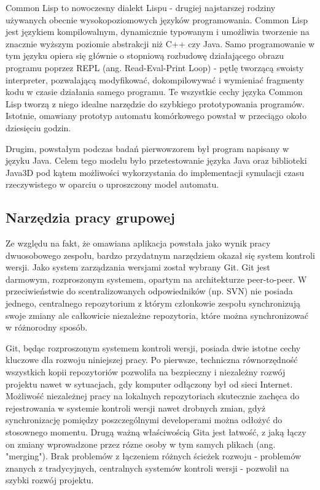 Common Lisp to nowoczesny dialekt Lispu - drugiej najstarszej rodziny używanych obecnie wysokopoziomowych języków programowania. Common Lisp jest językiem kompilowalnym, dynamicznie typowanym i umożliwia tworzenie na znacznie wyższym poziomie abstrakcji niż C++ czy Java. Samo programowanie w tym języku opiera się głównie o stopniową rozbudowę działającego obrazu programu poprzez REPL (ang. Read-Eval-Print Loop) - pętlę tworzącą swoisty interpreter, pozwalającą modyfikować, dokompilowywać i wymieniać fragmenty kodu w czasie działania samego programu. Te wszystkie cechy języka Common Lisp tworzą z niego idealne narzędzie do szybkiego prototypowania programów. Istotnie, omawiany prototyp automatu komórkowego powstał w przeciągo około dziesięciu godzin.

Drugim, powstałym podczas badań pierwowzorem był program napisany w języku Java.
Celem tego modelu było przetestowanie języka Java oraz biblioteki Java3D pod kątem możliwości wykorzystania do implementacji symulacji czasu rzeczywistego w oparciu o uproszczony model automatu. 

\subsection {Narzędzia pracy grupowej}
Ze względu na fakt, że omawiana aplikacja powstała jako wynik pracy dwuosobowego zespołu, bardzo przydatnym narzędziem okazał się system kontroli wersji. Jako system zarządzania wersjami został wybrany Git.
Git jest darmowym, rozproszonym systemem, opartym na architekturze peer-to-peer. W przeciwieństwie do scentralizowanych odpowiedników (np. SVN) nie posiada jednego, centralnego repozytorium z którym członkowie zespołu synchronizują swoje zmiany ale całkowicie niezależne repozytoria, które można synchronizować w różnorodny sposób.

Git, będąc rozproszonym systemem kontroli wersji, posiada dwie istotne cechy kluczowe dla rozwoju niniejszej pracy. Po pierwsze, techniczna równorzędność wszystkich kopii repozytoriów pozwoliła na bezpieczny i niezależny rozwój projektu nawet w sytuacjach, gdy komputer odłączony był od sieci Internet. Możliwość niezależnej pracy na lokalnych repozytoriach skutecznie zachęca do rejestrowania w systemie kontroli wersji nawet drobnych zmian, gdyż synchronizację pomiędzy poszczególnymi developerami można odłożyć do stosownego momentu. Drugą ważną właściwością Gita jest łatwość, z jaką łączy on zmiany wprowadzone przez rózne osoby w tym samych plikach (ang. "merging"). Brak problemów z łączeniem różnych ścieżek rozwoju - problemów znanych z tradycyjnych, centralnych systemów kontroli wersji - pozwolił na szybki rozwój projektu.

